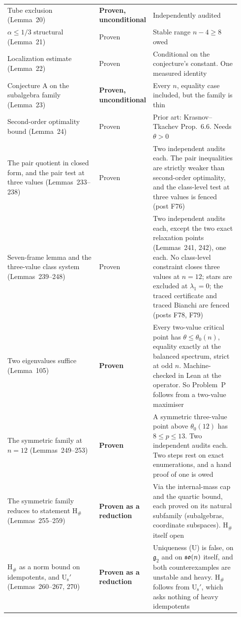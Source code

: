\begin{longtable}{@{}p{0.40\linewidth}p{0.16\linewidth}p{0.38\linewidth}@{}}
Tube exclusion (Lemma~20) & \textbf{Proven, unconditional} & Independently audited \\
$\alpha\le1/3$ structural (Lemma~21) & Proven & Stable range $n-4\ge8$ owed \\
Localization estimate (Lemma~22) & Proven & Conditional on the conjecture's constant. One measured identity \\
Conjecture A on the subalgebra family (Lemma~23) & \textbf{Proven, unconditional} & Every $n$, equality case included, but the family is thin \\
Second-order optimality bound (Lemma~24) & Proven & Prior art: Krasnov--Tkachev Prop.\ 6.6. Needs $\theta>0$ \\
The pair quotient in closed form, and the pair test at three values (Lemmas~233--238) & Proven & Two independent audits each. The pair inequalities are strictly weaker than second-order optimality, and the class-level test at three values is fenced (post F76) \\
Seven-frame lemma and the three-value class system (Lemmas~239--248) & Proven & Two independent audits each, except the two exact relaxation points (Lemmas~241, 242), one each. No class-level constraint closes three values at $n=12$; stars are excluded at $\lambda_1=0$; the traced certificate and traced Bianchi are fenced (posts F78, F79) \\
Two eigenvalues suffice (Lemma~105) & \textbf{Proven} & Every two-value critical point has $\theta\le\theta_0(n)$, equality exactly at the balanced spectrum, strict at odd $n$. Machine-checked in Lean at the operator. So Problem~P follows from a two-value maximiser \\
The symmetric family at $n=12$ (Lemmas~249--253) & \textbf{Proven} & A symmetric three-value point above $\theta_0(12)$ has $8\le p\le13$. Two independent audits each. Two steps rest on exact enumerations, and a hand proof of one is owed \\
The symmetric family reduces to statement H$_\#$ (Lemmas~255--259) & \textbf{Proven as a reduction} & Via the internal-mass cap and the quartic bound, each proved on its natural subfamily (subalgebras, coordinate subspaces). H$_\#$ itself open \\
H$_\#$ as a norm bound on idempotents, and U$_{\mathrm s}'$ (Lemmas~260--267, 270) & \textbf{Proven as a reduction} & Uniqueness (U) is false, on $\mathfrak g_2$ and on $\mathfrak{so}(n)$ itself, and both counterexamples are unstable and heavy. H$_\#$ follows from U$_{\mathrm s}'$, which asks nothing of heavy idempotents \\

\end{longtable}
